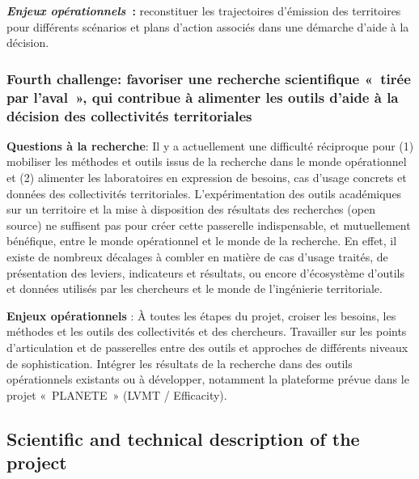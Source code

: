 \textit{\textbf{Enjeux opérationnels}}\textbf{ : }reconstituer les trajectoires d’émission des territoires pour différents scénarios et plans d’action associés dans une démarche d’aide à la décision.

 
\subsubsection{Fourth challenge: favoriser une recherche scientifique « tirée par l’aval », qui contribue à alimenter les outils d’aide à la décision des collectivités territoriales}

\textbf{Questions à la recherche}: Il y a actuellement une difficulté réciproque pour (1) mobiliser les méthodes et outils issus de la recherche dans le monde opérationnel et (2) alimenter les laboratoires en expression de besoins, cas d’usage concrets et données des collectivités territoriales. L’expérimentation des outils académiques sur un territoire et la mise à disposition des résultats des recherches (open source) ne suffisent pas pour créer cette passerelle indispensable, et mutuellement bénéfique, entre le monde opérationnel et le monde de la recherche. En effet, il existe de nombreux décalages à combler en matière de cas d’usage traités, de présentation des leviers, indicateurs et résultats, ou encore d’écosystème d’outils et données utilisés par les chercheurs et le monde de l’ingénierie territoriale.  

\textbf{Enjeux opérationnels }: À toutes les étapes du projet, croiser les besoins, les méthodes et les outils des collectivités et des chercheurs. Travailler sur les points d’articulation et de passerelles entre des outils et approches de différents niveaux de sophistication. Intégrer les résultats de la recherche dans des outils opérationnels existants ou à développer, notamment la plateforme prévue dans le projet « PLANETE » (LVMT / Efficacity).  


\subsection{Scientific and technical description of the project}


